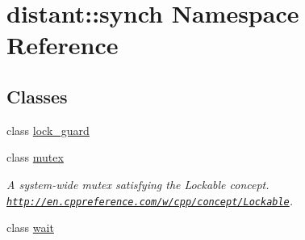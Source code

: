 \hypertarget{namespacedistant_1_1synch}{}\section{distant\+:\+:synch Namespace Reference}
\label{namespacedistant_1_1synch}
\subsection*{Classes}
\begin{DoxyCompactItemize}
\item 
class \mbox{\hyperlink{classdistant_1_1synch_1_1lock__guard}{lock\+\_\+guard}}
\item 
class \mbox{\hyperlink{classdistant_1_1synch_1_1mutex}{mutex}}
\begin{DoxyCompactList}\small\item\em A system-\/wide mutex satisfying the Lockable concept. \href{http://en.cppreference.com/w/cpp/concept/Lockable}{\tt http\+://en.\+cppreference.\+com/w/cpp/concept/\+Lockable}. \end{DoxyCompactList}\item 
class \mbox{\hyperlink{classdistant_1_1synch_1_1wait}{wait}}
\end{DoxyCompactItemize}
